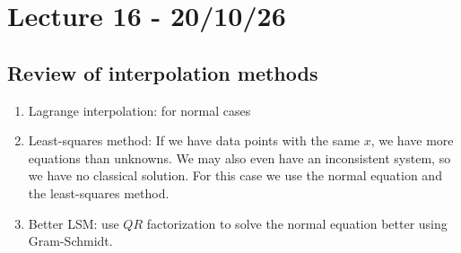 \documentclass[11pt]{article}
\begin{document}
\section{Lecture 16 - 20/10/26}
\subsection{Review of interpolation methods}
\begin{enumerate}
    \item Lagrange interpolation: for normal cases
    \item Least-squares method: If we have data points with the same $x$, we have more equations than unknowns. We may also even have an inconsistent system, so we have no classical solution.
    For this case we use the normal equation and the least-squares method.
    \item Better LSM: use $QR$ factorization to solve the normal equation better using Gram-Schmidt.
\end{enumerate}
\end{document}

